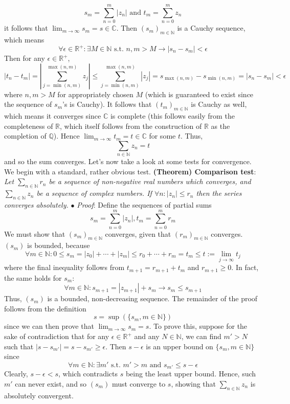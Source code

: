\documentclass{article}
\newcommand*{\tb}{\textbf}
\newcommand*{\ti}{\textit}
\newcommand*{\n}{\newline}
\newcommand*{\nn}{\newline \newline}
\newcommand*{\Pf}{\indent \ensuremath{\bullet} \textit{Proof}: }
\newcommand*{\N}{\mathbb{N}}
\newcommand*{\Q}{\mathbb{Q}}
\newcommand*{\R}{\mathbb{R}}
\newcommand*{\C}{\mathbb{C}}
\newcommand*{\st}{\text{ s.t. }}
\begin{document}
    $$ s_m = \sum_{n = 0}^m | z_n | \text{ and } t_m = \sum_{n = 0}^m z_n $$
it follows that $ \lim_{m \to \infty} s_m = s \in \C $. Then $ (s_m)_{m \in \N} $ is a Cauchy sequence, which means
    $$ \forall \epsilon \in \R^+: \exists M \in \N \st n, m > M \rightarrow | s_n - s_m | < \epsilon $$
Then for any $ \epsilon \in \R^+ $,
    $$ | t_n - t_m | = \left \lvert \sum_{j = \min(n, m)}^{\max(n, m)} z_j \right \rvert \leq \sum_{j = \min(n, m)}^{\max(n, m)} | z_j | = s_{\max(n, m)} - s_{\min(n, m)} = | s_n - s_m | < \epsilon $$
where $ n, m > M $ for appropriately chosen $ M $ (which is guaranteed to exist since the sequence of $ s_m $'s is Cauchy). It follows that $ ( t_m )_{m \in \N} $ is Cauchy as well, which means it converges since $ \C $ is complete (this follows easily from the completeness of $ \R $, which itself follows from the construction of $ \R $ as the completion of $ \Q $). Hence $ \lim_{m \to \infty} t_m = t \in \C $ for some $ t $. Thus,
    $$ \sum_{n \in \N} z_n = t $$
and so the sum converges. \qedsymbol
\nn
Let's now take a look at some tests for convergence. We begin with a standard, rather obvious test.
\nn
\tb{(Theorem) Comparison test}: \ti{Let $ \sum_{n \in \N} r_n $ be a sequence of non-negative real numbers which converges, and $ \sum_{n \in \N} z_n $ be a sequence of complex numbers. If $ \forall n: | z_n | \leq r_n $ then the series converges absolutely.}
\n
\Pf Define the sequences of partial sums
    $$ s_m = \sum_{n = 0}^m | z_n |, t_m = \sum_{n = 0}^m r_m $$ 
We must show that $ ( s_m )_{m \in \N} $ converges, given that $ ( r_m )_{m \in \N} $ converges. $ ( s_m ) $ is bounded, because
    $$ \forall m \in \N: 0 \leq s_m = | z_0 | + \cdots + | z_m | \leq r_0 + \cdots + r_m = t_m \leq t := \lim_{j \to \infty} t_j $$
where the final inequality follows from $ t_{m + 1} = r_{m + 1} + t_m $ and $ r_{m + 1} \geq 0 $. In fact, the same holds for $ s_m $:
    $$ \forall m \in \N: s_{m + 1} = | z_{m + 1} | + s_m \rightarrow s_m \leq s_{m + 1} $$
Thus, $ ( s_m ) $ is a bounded, non-decreasing sequence. The remainder of the proof follows from the definition
    $$ s = \sup \left( \{ s_m, m \in \N \} \right) $$
since we can then prove that $ \lim_{m \to \infty} s_m = s $. To prove this, suppose for the sake of contradiction that for any $ \epsilon \in \R^+ $ and any $ N \in \N $, we can find $ m' > N $ such that $ | s - s_{m'} | = s - s_{m'} \geq \epsilon $. Then $ s - \epsilon $ is an upper bound on $ \{ s_m, m \in \N \} $ since
    $$ \forall m \in \N: \exists m' \st m' > m \text{ and } s_{m'} \leq s - \epsilon $$
Clearly, $ s - \epsilon < s $, which contradicts $ s $ being the least upper bound. Hence, such $ m' $ can never exist, and so $ ( s_m ) $ must converge to $ s $, showing that $ \sum_{n \in \N} z_n $ is absolutely convergent.
\end{document}
